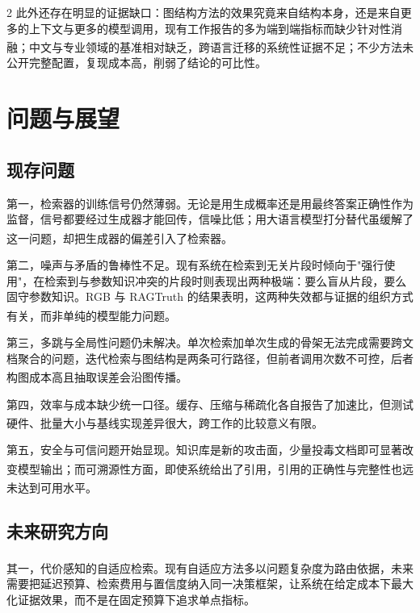 \documentclass[10.5pt,compsoc,UTF8]{CjC}
\theoremstyle{mystyle}
\newcommand{\upcite}[1]{\textsuperscript{\cite{#1}}}
\begin{document}
\begin{multicols}{2}
此外还存在明显的证据缺口：图结构方法的效果究竟来自结构本身，还是来自更多的上下文与更多的模型调用，现有工作报告的多为端到端指标而缺少针对性消融\upcite{edge2024from,guo2024lightrag}；中文与专业领域的基准相对缺乏，跨语言迁移的系统性证据不足；不少方法未公开完整配置，复现成本高，削弱了结论的可比性。

\section{\heiti 问题与展望}

\subsection{\heiti 现存问题}

第一，检索器的训练信号仍然薄弱。无论是用生成概率还是用最终答案正确性作为监督，信号都要经过生成器才能回传，信噪比低；用大语言模型打分替代虽缓解了这一问题\upcite{shi2023replug}，却把生成器的偏差引入了检索器。

第二，噪声与矛盾的鲁棒性不足。现有系统在检索到无关片段时倾向于"强行使用"，在检索到与参数知识冲突的片段时则表现出两种极端：要么盲从片段，要么固守参数知识。RGB 与 RAGTruth 的结果表明，这两种失效都与证据的组织方式有关，而非单纯的模型能力问题\upcite{chen2024benchmarking,niu2023ragtruth}。

第三，多跳与全局性问题仍未解决。单次检索加单次生成的骨架无法完成需要跨文档聚合的问题，迭代检索与图结构是两条可行路径，但前者调用次数不可控，后者构图成本高且抽取误差会沿图传播\upcite{trivedi2023interleaving,edge2024from}。

第四，效率与成本缺少统一口径。缓存、压缩与稀疏化各自报告了加速比，但测试硬件、批量大小与基线实现差异很大，跨工作的比较意义有限\upcite{jin2024ragcache,jiang2023llmlingua,xu2024recomp}。

第五，安全与可信问题开始显现。知识库是新的攻击面，少量投毒文档即可显著改变模型输出\upcite{zou2025poisonedrag}；而可溯源性方面，即使系统给出了引用，引用的正确性与完整性也远未达到可用水平\upcite{gao2023enabling,liu2023evaluating}。

\subsection{\heiti 未来研究方向}

其一，代价感知的自适应检索。现有自适应方法多以问题复杂度为路由依据\upcite{jeong2024adaptive}，未来需要把延迟预算、检索费用与置信度纳入同一决策框架，让系统在给定成本下最大化证据效果，而不是在固定预算下追求单点指标。


\end{multicols}
\end{document}
